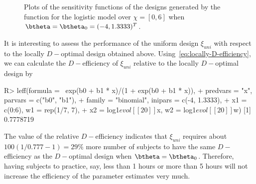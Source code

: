   \begin{figure}[t!]
\centering
{}
\caption{
  Plots of the   sensitivity functions  of the designs generated by  the  function for the logistic model over  $\chi =  [0, 6]$ when $\btheta = \btheta_0 =(-4, 1.3333)^T$.
}
\label{fig:sensitivity-logistic-locally}
\end{figure}

It is  interesting to assess the performance of  the uniform design $\xi_{uni}$ with respect to the locally $D-$optimal design obtained above. Using~\eqref{eq:locally-D-efficiency},  we can calculate the $D-$efficiency of  $\xi_{uni}$ relative to the  locally $D-$optimal design by
\begin{example}
R> leff(formula = ~exp(b0 + b1 * x)/(1 + exp(b0 + b1 * x)),
+      predvars = "x", parvars = c("b0", "b1"),
+      family = "binomial", inipars = c(-4, 1.3333),
+      x1 = c(0:6), w1 = rep(1/7, 7),
+      x2 = log1$evol[[20]]$x, w2 = log1$evol[[20]]$w)
[1] 0.7778719
\end{example}
The value of the relative $D-$efficiency indicates  that $\xi_{uni}$ requires about $100(1/0.777-1)= 29\%$ more number of subjects to have the same $D-$efficiency  as the $D-$optimal design when $\btheta = \btheta_0$.  Therefore, having subjects to practice, say, less than 1 hours or more than 5 hours will not increase the efficiency of the parameter estimates very much. 

